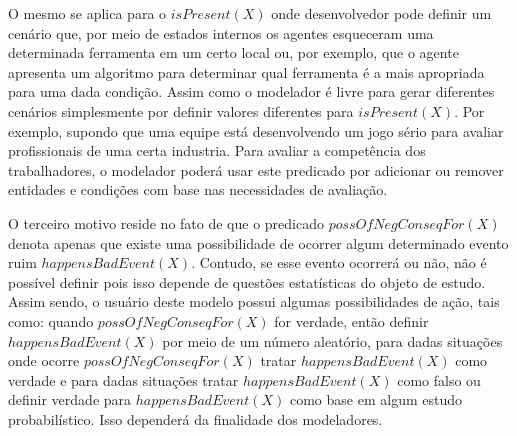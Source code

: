 O mesmo se aplica para o $isPresent(X)$ onde desenvolvedor pode definir um cenário que, por meio de estados internos os agentes esqueceram uma determinada ferramenta em um certo local ou, por exemplo, que o agente apresenta um algoritmo para determinar qual ferramenta é a mais apropriada para uma dada condição. Assim como o modelador é livre para gerar diferentes cenários simplesmente por definir valores diferentes para $isPresent(X)$. Por exemplo, supondo que uma equipe está desenvolvendo um jogo sério para avaliar profissionais de uma certa industria. Para avaliar a competência dos trabalhadores, o modelador poderá usar este predicado por adicionar ou remover entidades e condições com base nas necessidades de avaliação.

O terceiro motivo reside no fato de que o predicado $possOfNegConseqFor(X)$ denota apenas que existe uma possibilidade de ocorrer algum determinado evento ruim  $happensBadEvent(X)$. Contudo, se esse evento ocorrerá ou não, não é possível definir pois isso depende de questões estatísticas do objeto de estudo. Assim sendo, o usuário deste modelo possui algumas possibilidades de ação, tais como: quando $possOfNegConseqFor(X)$  for verdade, então definir $happensBadEvent(X)$ por meio de um número aleatório, para dadas situações onde ocorre $possOfNegConseqFor(X)$ tratar $happensBadEvent(X)$ como verdade e para dadas situações tratar $happensBadEvent(X)$ como falso ou definir verdade para $happensBadEvent(X)$ como base em algum estudo probabilístico. Isso dependerá da finalidade dos modeladores. 